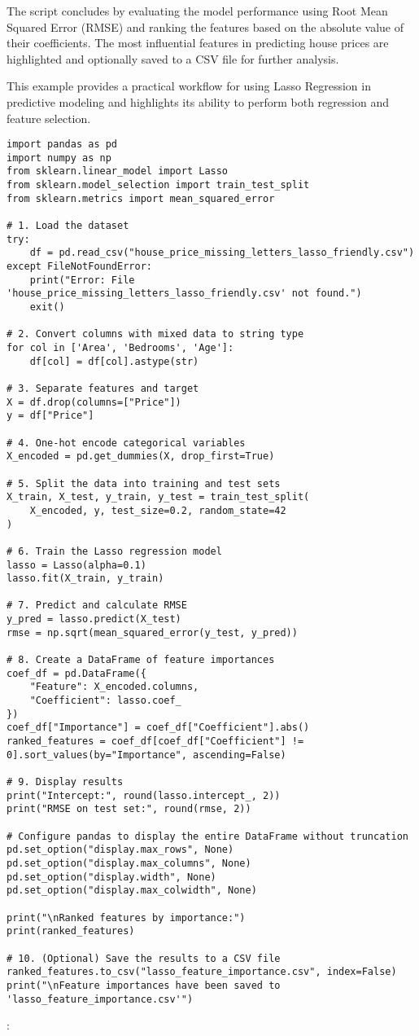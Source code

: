 \documentclass[12pt, a4paper]{report}
\begin{document}
The script concludes by evaluating the model performance using Root Mean Squared Error (RMSE) and ranking the features based on the absolute value of their coefficients. The most influential features in predicting house prices are highlighted and optionally saved to a CSV file for further analysis.

This example provides a practical workflow for using Lasso Regression in predictive modeling and highlights its ability to perform both regression and feature selection.

\begin{lstlisting}[style=pythonstyle]
import pandas as pd
import numpy as np
from sklearn.linear_model import Lasso
from sklearn.model_selection import train_test_split
from sklearn.metrics import mean_squared_error

# 1. Load the dataset
try:
    df = pd.read_csv("house_price_missing_letters_lasso_friendly.csv")
except FileNotFoundError:
    print("Error: File 'house_price_missing_letters_lasso_friendly.csv' not found.")
    exit()

# 2. Convert columns with mixed data to string type
for col in ['Area', 'Bedrooms', 'Age']:
    df[col] = df[col].astype(str)

# 3. Separate features and target
X = df.drop(columns=["Price"])
y = df["Price"]

# 4. One-hot encode categorical variables
X_encoded = pd.get_dummies(X, drop_first=True)

# 5. Split the data into training and test sets
X_train, X_test, y_train, y_test = train_test_split(
    X_encoded, y, test_size=0.2, random_state=42
)

# 6. Train the Lasso regression model
lasso = Lasso(alpha=0.1)
lasso.fit(X_train, y_train)

# 7. Predict and calculate RMSE
y_pred = lasso.predict(X_test)
rmse = np.sqrt(mean_squared_error(y_test, y_pred))

# 8. Create a DataFrame of feature importances
coef_df = pd.DataFrame({
    "Feature": X_encoded.columns,
    "Coefficient": lasso.coef_
})
coef_df["Importance"] = coef_df["Coefficient"].abs()
ranked_features = coef_df[coef_df["Coefficient"] != 0].sort_values(by="Importance", ascending=False)

# 9. Display results
print("Intercept:", round(lasso.intercept_, 2))
print("RMSE on test set:", round(rmse, 2))

# Configure pandas to display the entire DataFrame without truncation
pd.set_option("display.max_rows", None)
pd.set_option("display.max_columns", None)
pd.set_option("display.width", None)
pd.set_option("display.max_colwidth", None)

print("\nRanked features by importance:")
print(ranked_features)

# 10. (Optional) Save the results to a CSV file
ranked_features.to_csv("lasso_feature_importance.csv", index=False)
print("\nFeature importances have been saved to 'lasso_feature_importance.csv'")
\end{lstlisting}
\newpage:
\end{document}
